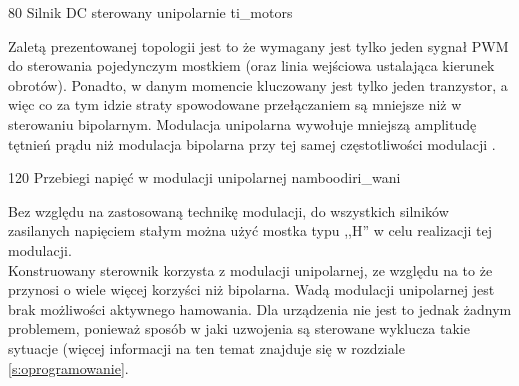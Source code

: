 	{80}
	{Silnik DC sterowany unipolarnie}
	{ti_motors}


Zaletą prezentowanej topologii jest to że wymagany jest tylko jeden sygnał PWM do sterowania pojedynczym mostkiem (oraz linia wejściowa ustalająca kierunek obrotów). Ponadto, w danym momencie kluczowany jest tylko jeden tranzystor, a więc co za tym idzie straty spowodowane przełączaniem są mniejsze niż w sterowaniu bipolarnym. Modulacja unipolarna wywołuje mniejszą amplitudę tętnień prądu niż modulacja bipolarna przy tej samej częstotliwości modulacji \cite{zawirski}. 

	{120}
	{Przebiegi napięć w modulacji unipolarnej}
	{namboodiri_wani}

Bez względu na zastosowaną technikę modulacji, do wszystkich silników zasilanych napięciem stałym można użyć mostka typu ,,H'' w celu realizacji tej modulacji. \\

Konstruowany sterownik korzysta z modulacji unipolarnej, ze względu na to że przynosi o wiele więcej korzyści niż bipolarna. Wadą modulacji unipolarnej jest brak możliwości aktywnego hamowania. Dla urządzenia nie jest to jednak żadnym problemem, ponieważ sposób w jaki uzwojenia są sterowane wyklucza takie sytuacje (więcej informacji na ten temat znajduje się w rozdziale \ref{s:oprogramowanie}.




